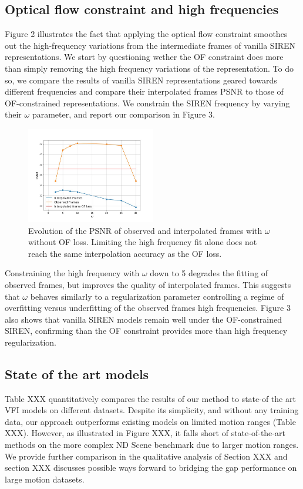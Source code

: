 \documentclass{article}
\begin{document}
\subsection{Optical flow constraint and high frequencies}

Figure 2 illustrates the fact that applying the optical flow constraint smoothes out the high-frequency variations
from the intermediate frames of vanilla SIREN representations.
We start by questioning wether the OF constraint does more than simply removing the high frequency variations of the representation.
To do so, we compare the results of vanilla SIREN representations geared towards different frequencies and compare
their interpolated frames PSNR to those of OF-constrained representations.
We constrain the SIREN frequency by varying their $\omega$ parameter,
and report our comparison in Figure 3.

\begin{figure}[t]
\centering
\includegraphics[width=0.5\textwidth]{"omega_wo_of"}
\caption{Evolution of the PSNR of observed and interpolated frames with $\omega$ without OF loss.
Limiting the high frequency fit alone does not reach the same interpolation accuracy as the OF loss.}
\end{figure}

Constraining the high frequency with $\omega$ down to 5 degrades the fitting of observed frames,
but improves the quality of interpolated frames.
This suggests that $\omega$ behaves similarly to a regularization parameter
controlling a regime of overfitting versus underfitting of the observed frames high frequencies.
Figure 3 also shows that vanilla SIREN models remain well under the OF-constrained SIREN,
confirming than the OF constraint provides more than high frequency regularization.

\subsection{State of the art models}
\label{sec_sota}
Table XXX quantitatively compares the results of our method to state-of the art VFI models on different datasets.
Despite its simplicity, and without any training data, our approach outperforms existing models on limited motion ranges (Table XXX).
However, as illustrated in Figure XXX, it falls short of state-of-the-art methods on the more complex ND Scene benchmark due to larger motion ranges.
We provide further comparison in the qualitative analysis of Section XXX and section XXX discusses possible ways forward
to bridging the gap performance on large motion datasets.
\end{document}
